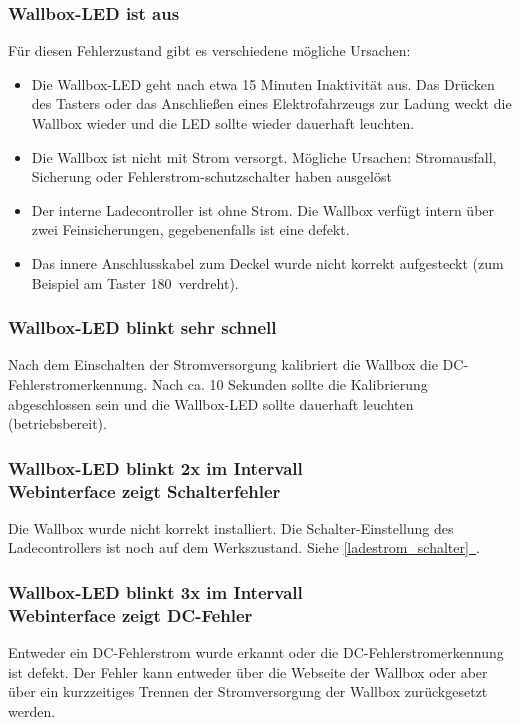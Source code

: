 \documentclass[a4paper,10pt]{article}
\newcommand*{\fullref}[1]{\hyperref[{#1}]{\ref*{#1}~\nameref*{#1}}}
\begin{document}
\begin{multicols*}{2}
	\subsubsection*{Wallbox-LED ist aus}
	Für diesen Fehlerzustand gibt es verschiedene mögliche Ursachen:
	\begin{itemize}
		\item Die Wallbox-LED geht nach etwa 15 Minuten Inaktivität aus. Das Drücken des Tasters
		      oder das Anschließen eines Elektrofahrzeugs zur Ladung weckt die Wallbox wieder
		      und die LED sollte wieder dauerhaft leuchten.
		\item Die Wallbox ist nicht mit Strom versorgt. Mögliche Ursachen: Stromausfall,
		      Sicherung oder Fehlerstrom-schutzschalter haben ausgelöst
		\item Der interne Ladecontroller ist ohne Strom. Die Wallbox verfügt intern über zwei
		      Feinsicherungen, gegebenenfalls ist eine defekt.
		\item Das innere Anschlusskabel zum Deckel wurde nicht korrekt aufgesteckt (zum Beispiel am Taster 180\textdegree\ verdreht).
	\end{itemize}

	\subsubsection*{Wallbox-LED blinkt sehr schnell}
	Nach dem Einschalten der Stromversorgung kalibriert die Wallbox die
	DC-Fehlerstromerkennung. Nach ca. 10 Sekunden sollte die Kalibrierung
	abgeschlossen sein und die Wallbox-LED sollte dauerhaft leuchten
	(betriebsbereit).

	\subsubsection*{Wallbox-LED blinkt 2x im Intervall \\ Webinterface zeigt Schalterfehler}
	Die Wallbox wurde nicht korrekt installiert. Die Schalter-Einstellung des Ladecontrollers ist
	noch auf dem Werkszustand. Siehe \fullref{ladestrom_schalter}.

	\begin{minipage}{\linewidth} %
		\subsubsection*{Wallbox-LED blinkt 3x im Intervall \\ Webinterface zeigt DC-Fehler}
		Entweder ein DC-Fehlerstrom wurde erkannt oder die DC-Fehlerstromerkennung ist defekt.
		Der Fehler kann entweder über die Webseite der Wallbox oder aber über
		ein kurzzeitiges Trennen der Stromversorgung der Wallbox zurückgesetzt
		werden.
	\end{minipage}


\end{multicols*}
\end{document}
